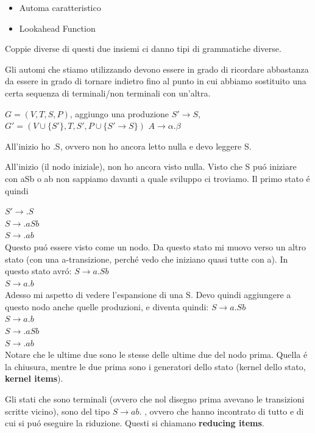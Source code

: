 \begin{itemize}
    \item Automa caratteristico \\
    \item Lookahead Function \\
\end{itemize}

Coppie diverse di questi due insiemi ci danno tipi di grammatiche diverse.

Gli automi che stiamo utilizzando devono essere in grado di ricordare abbastanza da essere in grado di tornare indietro fino al punto 
in cui abbiamo sostituito una certa sequenza di terminali/non terminali con un'altra.

$G = (V,T,S,P)$, aggiungo una produzione $S' \rightarrow S$, $G' = (V \cup \{S'\},T,S',P \cup \{S' \rightarrow S\})$
$A \rightarrow \alpha . \beta $ 

All'inizio ho .S, ovvero non ho ancora letto nulla e devo leggere S.

All'inizio (il nodo iniziale), non ho ancora visto nulla. Visto che S pu\'o iniziare con aSb o ab non sappiamo davanti a quale sviluppo ci troviamo. Il primo stato \'e quindi 

$S' \rightarrow .S$\\
$S \rightarrow .aSb$\\
$S \rightarrow .ab$\\

Questo pu\'o essere visto come un nodo. Da questo stato mi muovo verso un altro stato (con una a-transizione, perch\'e vedo che iniziano 
quasi tutte con a). In questo stato avr\'o:
$S \rightarrow a.Sb$\\
$S \rightarrow a.b$\\

Adesso mi aspetto di vedere l'espansione di una S. Devo quindi aggiungere a questo nodo anche quelle produzioni, e diventa quindi:
$S \rightarrow a.Sb$\\
$S \rightarrow a.b$\\
$S \rightarrow .aSb$\\
$S \rightarrow .ab$\\

Notare che le ultime due sono le stesse delle ultime due del nodo prima. Quella \'e la chiusura, mentre le due prima sono i generatori dello stato (kernel dello stato, \textbf{kernel items}).

Gli stati che sono terminali (ovvero che nol disegno prima avevano le transizioni scritte vicino), sono del tipo $S \rightarrow ab.$ ,
ovvero che hanno incontrato di tutto e di cui si pu\'o eseguire la riduzione. Questi si chiamano \textbf{reducing items}.

